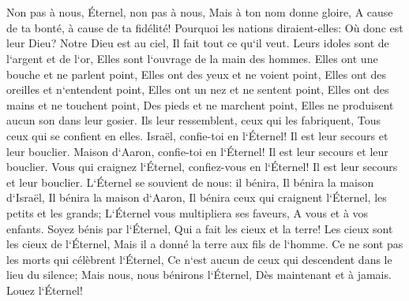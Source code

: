 \chapter{}

\verse Non pas à nous, Éternel, non pas à nous, Mais à ton nom donne gloire, A cause de ta bonté, à cause de ta fidélité! 
\verse Pourquoi les nations diraient-elles: Où donc est leur Dieu? 
\verse Notre Dieu est au ciel, Il fait tout ce qu`il veut. 
\verse Leurs idoles sont de l`argent et de l`or, Elles sont l`ouvrage de la main des hommes. 
\verse Elles ont une bouche et ne parlent point, Elles ont des yeux et ne voient point, 
\verse Elles ont des oreilles et n`entendent point, Elles ont un nez et ne sentent point, 
\verse Elles ont des mains et ne touchent point, Des pieds et ne marchent point, Elles ne produisent aucun son dans leur gosier. 
\verse Ils leur ressemblent, ceux qui les fabriquent, Tous ceux qui se confient en elles. 
\verse Israël, confie-toi en l`Éternel! Il est leur secours et leur bouclier. 
\verse Maison d`Aaron, confie-toi en l`Éternel! Il est leur secours et leur bouclier. 
\verse Vous qui craignez l`Éternel, confiez-vous en l`Éternel! Il est leur secours et leur bouclier. 
\verse L`Éternel se souvient de nous: il bénira, Il bénira la maison d`Israël, Il bénira la maison d`Aaron, 
\verse Il bénira ceux qui craignent l`Éternel, les petits et les grands; 
\verse L`Éternel vous multipliera ses faveurs, A vous et à vos enfants. 
\verse Soyez bénis par l`Éternel, Qui a fait les cieux et la terre! 
\verse Les cieux sont les cieux de l`Éternel, Mais il a donné la terre aux fils de l`homme. 
\verse Ce ne sont pas les morts qui célèbrent l`Éternel, Ce n`est aucun de ceux qui descendent dans le lieu du silence; 
\verse Mais nous, nous bénirons l`Éternel, Dès maintenant et à jamais. Louez l`Éternel! 

\chapter{}

